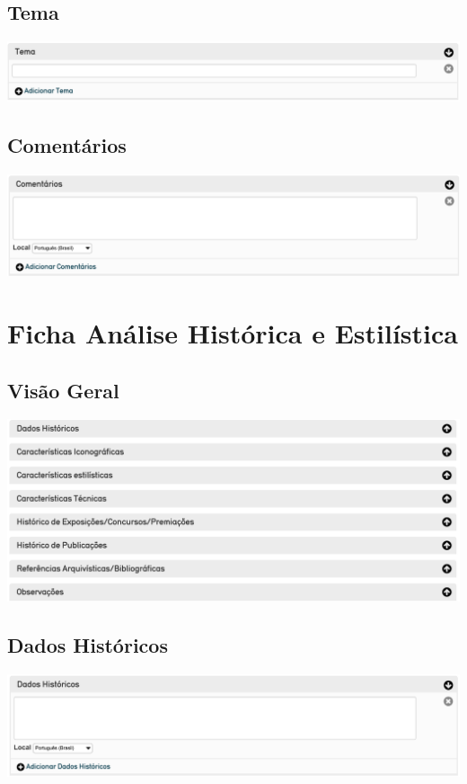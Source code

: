 \subsection{Tema}
\begin{flushleft}
	\includegraphics[width=\linewidth]{elemento-16}
\end{flushleft}

\subsection{Comentários}
\begin{flushleft}
	\includegraphics[width=\linewidth]{elemento-17}
\end{flushleft}

\section{Ficha Análise Histórica e Estilística}
\subsection{Visão Geral}
\begin{flushleft}
	\includegraphics[width=\linewidth]{elementoFichaAnalise}
\end{flushleft}

\subsection{Dados Históricos}
\begin{flushleft}
	\includegraphics[width=\linewidth]{elemento-18}
\end{flushleft}

